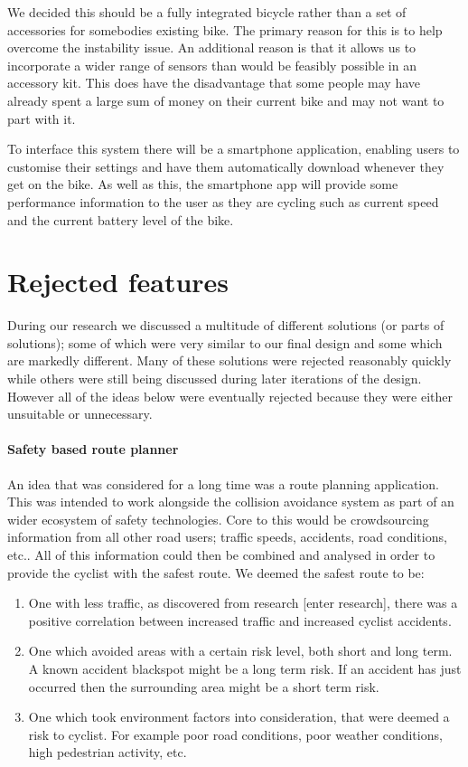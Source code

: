 \documentclass[a4paper]{report}
\begin{document}
We decided this should be a fully integrated bicycle rather than a set of accessories for somebodies existing bike. The primary reason for this is to help overcome the instability issue. An additional reason is that it allows us to incorporate a wider range of sensors than would be feasibly possible in an accessory kit. This does have the disadvantage that some people may have already spent a large sum of money on their current bike and may not want to part with it.


To interface this system there will be a smartphone application, enabling users to customise their settings and have them automatically download whenever they get on the bike. As well as this, the smartphone app will provide some performance information to the user as they are cycling such as current speed and the current battery level of the bike.

\section{Rejected features}
During our research we discussed a multitude of different solutions (or parts of solutions); some of which were very similar to our final design and some which are markedly different. Many of these solutions were rejected reasonably quickly while others were still being discussed during later iterations of the design. However all of the ideas below were eventually rejected because they were either unsuitable or unnecessary.

\paragraph{Safety based route planner} \label{subsec:rejected} An idea that was considered for a long time was a route planning application. This was intended to work alongside the collision avoidance system as part of an wider ecosystem of safety technologies. Core to this would be crowdsourcing information from all other road users; traffic speeds, accidents, road conditions, etc.. All of this information could then be combined and analysed in order to provide the cyclist with the safest route. We deemed the safest route to be: 
\begin{enumerate}
\item One with less traffic, as discovered from research [enter research], there was a positive correlation between increased traffic and increased cyclist accidents. 
\item One which avoided areas with a certain risk level, both short and long term. A known accident blackspot might be a long term risk. If an accident has just occurred then the surrounding area might be a short term risk.
\item One which took environment factors into consideration, that were deemed a risk to cyclist. For example poor road conditions, poor weather conditions, high pedestrian activity, etc.
\end{enumerate}
 
\end{document}
